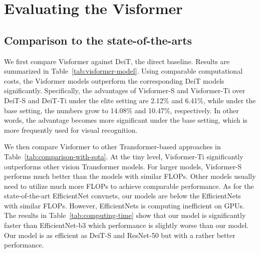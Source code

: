 \documentclass[10pt,twocolumn,letterpaper]{article}
\begin{document}
\section{Evaluating the Visformer}

\subsection{Comparison to the state-of-the-arts}

We first compare Visformer against DeiT, the direct baseline. Results are summarized in Table~\ref{tab:visformer-model}. Using comparable computational costs, the Visformer models outperform the corresponding DeiT models significantly. Specifically, the advantages of Visformer-S and Visformer-Ti over DeiT-S and DeiT-Ti under the elite setting are 2.12\% and 6.41\%, while under the base setting, the numbers grow to 14.08\% and 10.47\%, respectively. In other words, the advantage becomes more significant under the base setting, which is more frequently used for visual recognition.

We then compare Visformer to other Transformer-based approaches in Table~\ref{tab:comparison-with-sota}. At the tiny level, Visformer-Ti significantly outperforms other vision Transformer models. For larger models, Visformer-S performs much better than the models with similar FLOPs. Other models usually need to utilize much more FLOPs to achieve comparable performance. As for the state-of-the-art EfficientNet convnets, our models are below the EfficientNets with similar FLOPs. However, EfficientNets is computing inefficient on GPUs. The results in Table~\ref{tab:computing-time} show that our model is significantly faster than EfficientNet-b3 which performance is slightly worse than our model. Our model is as efficient as DeiT-S and ResNet-50 but with a rather better performance.
\end{document}
